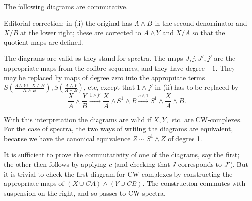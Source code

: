 \documentclass[../main]{subfiles}
\begin{document}
\begin{lemma}\label{lem:p3c09.9}  The following diagrams are commutative.
\begin{center}
\end{center}
\begin{center}
\end{center}
\noindent Editorial correction: in (ii) the original has $A\wedge B$ in the second denominator and $X/B$ at the lower right; these are corrected to $A\wedge Y$ and $X/A$ so that the quotient maps are defined.
\end{lemma}

\begin{notes}  The diagrams are valid as they stand for spectra. The maps $J, j, J', j'$ are the appropriate maps from the cofibre sequences, and they have degree $-1$. They may be replaced by maps of degree zero into the appropriate terms $S(\frac{A \wedge Y \cup X \wedge B}{X \wedge B}), S(\frac{A \wedge Y}{A \wedge B})$, etc, except that $1 \wedge j'$ in (ii) has to be replaced by \[\frac{X}{A} \wedge \frac{Y}{B} \xrightarrow{1\wedge j'} \frac{X}{A} \wedge S^1 \wedge B \xrightarrow{c \wedge 1} S^1 \wedge \frac{X}{A} \wedge B.\]

With this interpretation the diagrams are valid if $X, Y,$ etc. are CW-complexes.  For the case of spectra, the two ways of writing the diagrams are equivalent, because we have the canonical equivalence $Z \sim S^1 \wedge Z$ of degree 1.

\par It is sufficient to prove the commutativity of one of the diagrams, say the first; the other then follows by applying $c$ (and checking that $J$ corresponds to $J'$). But it is trivial to check the first diagram for CW-complexes by constructing the appropriate maps of $(X \cup CA) \wedge (Y \cup CB)$. The construction commutes with suspension on the right, and so passes
to CW-spectra.

\end{notes}
\end{document}
